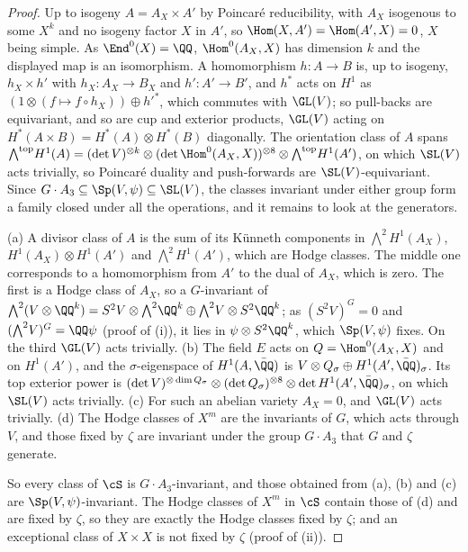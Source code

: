 \begin{proof}
Up to isogeny $A=A_{X}\times A'$ by Poincar\'e reducibility, with $A_{X}$
isogenous to some $X^{k}$ and no isogeny factor $X$ in $A'$, so
$\Hom(X,A')=\Hom(A',X)=0$, $X$ being simple. As $\End^{0}(X)=\QQ$,
$\Hom^{0}(A_{X},X)$ has dimension $k$ and the displayed map is an isomorphism.
A homomorphism $h\colon A\to B$ is, up to isogeny, $h_{X}\times h'$ with
$h_{X}\colon A_{X}\to B_{X}$ and $h'\colon A'\to B'$, and $h^{*}$ acts on
$H^{1}$ as $(1\otimes(f\mapsto f\circ h_{X}))\oplus h'^{*}$, which commutes
with $\GL(V)$; so pull-backs are equivariant, and so are cup and exterior
products, $\GL(V)$ acting on $H^{*}(A\times B)=H^{*}(A)\otimes H^{*}(B)$
diagonally. The orientation class of $A$ spans
${\textstyle\bigwedge^{\mathrm{top}}}H^{1}(A)=(\det V)^{\otimes k}\otimes
(\det\Hom^{0}(A_{X},X))^{\otimes8}\otimes{\textstyle\bigwedge^{\mathrm{top}}}H^{1}(A')$, on
which $\SL(V)$ acts trivially, so Poincar\'e duality and push-forwards are
$\SL(V)$-equivariant. Since $G\cdot A_{3}\subseteq\Sp(V,\psi)\subseteq\SL(V)$,
the classes invariant under either group form a family closed under all the
operations, and it remains to look at the generators.

(a) A divisor class of $A$ is the sum of its K\"unneth components in
${\textstyle\bigwedge^{2}}H^{1}(A_{X})$, $H^{1}(A_{X})\otimes H^{1}(A')$ and
${\textstyle\bigwedge^{2}}H^{1}(A')$, which are Hodge classes. The middle one corresponds to a
homomorphism from $A'$ to the dual of $A_{X}$, which is zero. The first is a
Hodge class of $A_{X}$, so a $G$-invariant of ${\textstyle\bigwedge^{2}}(V\otimes\QQ^{k})=
S^{2}V\otimes{\textstyle\bigwedge^{2}}\QQ^{k}\oplus{\textstyle\bigwedge^{2}}V\otimes S^{2}\QQ^{k}$; as
$(S^{2}V)^{G}=0$ and $({\textstyle\bigwedge^{2}}V)^{G}=\QQ\psi$ (proof of
(i)), it lies in
$\psi\otimes S^{2}\QQ^{k}$, which $\Sp(V,\psi)$ fixes. On the third $\GL(V)$
acts trivially. (b) The field $E$ acts on $Q=\Hom^{0}(A_{X},X)$ and on
$H^{1}(A')$, and the $\sigma$-eigenspace of $H^{1}(A,\bar{\QQ})$ is
$V\otimes Q_{\sigma}\oplus H^{1}(A',\bar{\QQ})_{\sigma}$. Its top exterior
power is $(\det V)^{\otimes\dim Q_{\sigma}}\otimes(\det Q_{\sigma})^{\otimes8}
\otimes\det H^{1}(A',\bar{\QQ})_{\sigma}$, on which $\SL(V)$ acts trivially.
(c) For such an abelian variety
$A_{X}=0$, and $\GL(V)$ acts trivially. (d) The Hodge classes of $X^{m}$ are
the invariants of $G$, which acts through $V$, and those fixed by $\zeta$ are
invariant under the group $G\cdot A_{3}$ that $G$ and $\zeta$ generate.

So every class of $\cS$ is $G\cdot A_{3}$-invariant, and those obtained from
(a), (b) and (c) are $\Sp(V,\psi)$-invariant. The Hodge classes of $X^{m}$ in
$\cS$ contain those of (d) and are fixed by $\zeta$, so they are exactly the
Hodge classes fixed by $\zeta$; and an exceptional class of $X\times X$ is not
fixed by $\zeta$ (proof of (ii)).
\end{proof}

